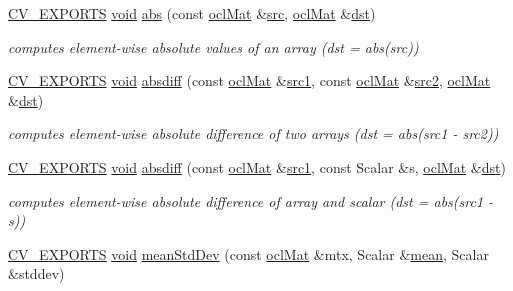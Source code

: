 \begin{DoxyCompactItemize}
\hyperlink{core_2types__c_8h_a1bf9f0e121b54272da02379cfccd0a2b}{C\-V\-\_\-\-E\-X\-P\-O\-R\-T\-S} \hyperlink{legacy_8hpp_a8bb47f092d473522721002c86c13b94e}{void} \hyperlink{namespacecv_1_1ocl_a24971c8a492e4fd222c913dbe4b2786f}{abs} (const \hyperlink{classcv_1_1ocl_1_1oclMat}{ocl\-Mat} \&\hyperlink{legacy_8hpp_a371cd109b74033bc4366f584edd3dacc}{src}, \hyperlink{classcv_1_1ocl_1_1oclMat}{ocl\-Mat} \&\hyperlink{photo__c_8h_aed13e2a25279b24dc954073233fef7a5}{dst})
\begin{DoxyCompactList}\small\item\em computes element-\/wise absolute values of an array (dst = abs(src)) \end{DoxyCompactList}\item 
\hyperlink{core_2types__c_8h_a1bf9f0e121b54272da02379cfccd0a2b}{C\-V\-\_\-\-E\-X\-P\-O\-R\-T\-S} \hyperlink{legacy_8hpp_a8bb47f092d473522721002c86c13b94e}{void} \hyperlink{namespacecv_1_1ocl_ae5f7cef64564bce4c917c8c909d2d121}{absdiff} (const \hyperlink{classcv_1_1ocl_1_1oclMat}{ocl\-Mat} \&\hyperlink{core__c_8h_a897de4702c922f4cccda0d57ccdcafb3}{src1}, const \hyperlink{classcv_1_1ocl_1_1oclMat}{ocl\-Mat} \&\hyperlink{core__c_8h_a7561a36d48069d54a6c8ac4e4750edfd}{src2}, \hyperlink{classcv_1_1ocl_1_1oclMat}{ocl\-Mat} \&\hyperlink{photo__c_8h_aed13e2a25279b24dc954073233fef7a5}{dst})
\begin{DoxyCompactList}\small\item\em computes element-\/wise absolute difference of two arrays (dst = abs(src1 -\/ src2)) \end{DoxyCompactList}\item 
\hyperlink{core_2types__c_8h_a1bf9f0e121b54272da02379cfccd0a2b}{C\-V\-\_\-\-E\-X\-P\-O\-R\-T\-S} \hyperlink{legacy_8hpp_a8bb47f092d473522721002c86c13b94e}{void} \hyperlink{namespacecv_1_1ocl_a918e2b9cd83c3763bc703365532696c9}{absdiff} (const \hyperlink{classcv_1_1ocl_1_1oclMat}{ocl\-Mat} \&\hyperlink{core__c_8h_a897de4702c922f4cccda0d57ccdcafb3}{src1}, const Scalar \&s, \hyperlink{classcv_1_1ocl_1_1oclMat}{ocl\-Mat} \&\hyperlink{photo__c_8h_aed13e2a25279b24dc954073233fef7a5}{dst})
\begin{DoxyCompactList}\small\item\em computes element-\/wise absolute difference of array and scalar (dst = abs(src1 -\/ s)) \end{DoxyCompactList}\item 
\hyperlink{core_2types__c_8h_a1bf9f0e121b54272da02379cfccd0a2b}{C\-V\-\_\-\-E\-X\-P\-O\-R\-T\-S} \hyperlink{legacy_8hpp_a8bb47f092d473522721002c86c13b94e}{void} \hyperlink{namespacecv_1_1ocl_a1d6e2b48880a5bc337225257269b2d92}{mean\-Std\-Dev} (const \hyperlink{classcv_1_1ocl_1_1oclMat}{ocl\-Mat} \&mtx, Scalar \&\hyperlink{core__c_8h_ad090d0faa53f44e0377c8d63dab3fa20}{mean}, Scalar \&stddev)

\end{DoxyCompactItemize}
